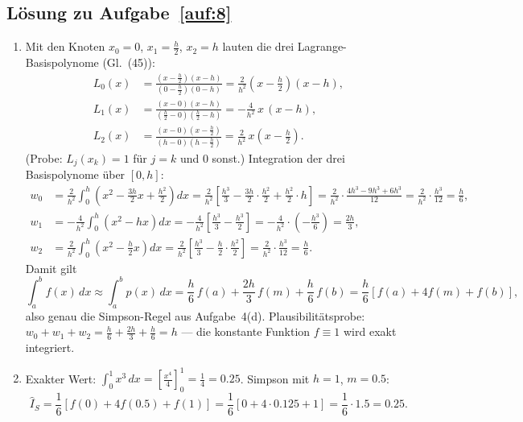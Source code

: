 \documentclass[a4paper,11pt]{scrartcl}
\begin{document}
\subsection*{Lösung zu Aufgabe~\ref{auf:8}}

\begin{enumerate}[label=(\alph*)]
  \item Mit den Knoten $x_0 = 0$, $x_1 = \frac{h}{2}$, $x_2 = h$ lauten die drei Lagrange-Basispolynome (Gl.~(45)):
  \begin{align*}
  L_0(x) &= \frac{(x - \frac{h}{2})(x - h)}{(0 - \frac{h}{2})(0 - h)} = \frac{2}{h^2}\left(x - \tfrac{h}{2}\right)(x - h), \\
  L_1(x) &= \frac{(x - 0)(x - h)}{(\frac{h}{2} - 0)(\frac{h}{2} - h)} = -\frac{4}{h^2}\,x\,(x - h), \\
  L_2(x) &= \frac{(x - 0)(x - \frac{h}{2})}{(h - 0)(h - \frac{h}{2})} = \frac{2}{h^2}\,x\left(x - \tfrac{h}{2}\right).
  \end{align*}
  (Probe: $L_j(x_k) = 1$ für $j = k$ und $0$ sonst.) Integration der drei Basispolynome über $[0, h]$:
  \begin{align*}
  w_0 &= \frac{2}{h^2}\int_0^h \left(x^2 - \tfrac{3h}{2}x + \tfrac{h^2}{2}\right) dx
       = \frac{2}{h^2}\left[\frac{h^3}{3} - \frac{3h}{2}\cdot\frac{h^2}{2} + \frac{h^2}{2}\cdot h\right]
       = \frac{2}{h^2}\cdot\frac{4h^3 - 9h^3 + 6h^3}{12} = \frac{2}{h^2}\cdot\frac{h^3}{12} = \frac{h}{6}, \\
  w_1 &= -\frac{4}{h^2}\int_0^h \left(x^2 - hx\right) dx
       = -\frac{4}{h^2}\left[\frac{h^3}{3} - \frac{h^3}{2}\right]
       = -\frac{4}{h^2}\cdot\left(-\frac{h^3}{6}\right) = \frac{2h}{3}, \\
  w_2 &= \frac{2}{h^2}\int_0^h \left(x^2 - \tfrac{h}{2}x\right) dx
       = \frac{2}{h^2}\left[\frac{h^3}{3} - \frac{h}{2}\cdot\frac{h^2}{2}\right]
       = \frac{2}{h^2}\cdot\frac{h^3}{12} = \frac{h}{6}.
  \end{align*}
  Damit gilt
  \[ \int_a^b f(x)\,dx \approx \int_a^b p(x)\,dx = \frac{h}{6}\,f(a) + \frac{2h}{3}\,f(m) + \frac{h}{6}\,f(b) = \frac{h}{6}\left[f(a) + 4f(m) + f(b)\right], \]
  also genau die Simpson-Regel aus Aufgabe~4(d). Plausibilitätsprobe: $w_0 + w_1 + w_2 = \frac{h}{6} + \frac{2h}{3} + \frac{h}{6} = h$ --- die konstante Funktion $f \equiv 1$ wird exakt integriert.
  \item Exakter Wert: $\int_0^1 x^3\,dx = \left[\frac{x^4}{4}\right]_0^1 = \frac{1}{4} = 0.25$. Simpson mit $h = 1$, $m = 0.5$:
  \[ \hat{I}_S = \frac{1}{6}\left[f(0) + 4f(0.5) + f(1)\right] = \frac{1}{6}\left[0 + 4 \cdot 0.125 + 1\right] = \frac{1}{6} \cdot 1.5 = 0.25. \]

\end{enumerate}
\end{document}
